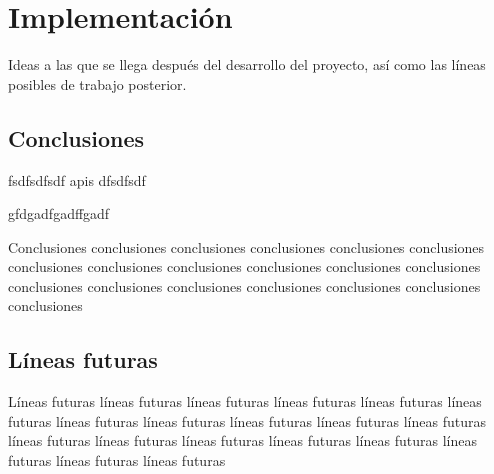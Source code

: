 \vspace*{-1cm}


\section{Implementación} %
\label{sec:implementacion}


Ideas a las que se llega después del desarrollo del proyecto, así como las líneas posibles de trabajo posterior.

\subsection{Conclusiones}

fsdfsdfsdf \glspl{api} dfsdfsdf 

gfdgadfgadffgadf \cite{android_developers_architectures}

Conclusiones conclusiones conclusiones conclusiones conclusiones conclusiones conclusiones conclusiones conclusiones conclusiones conclusiones conclusiones conclusiones conclusiones conclusiones conclusiones conclusiones conclusiones conclusiones

\subsection{Líneas futuras}
Líneas futuras líneas futuras líneas futuras líneas futuras líneas futuras líneas futuras líneas futuras líneas futuras líneas futuras líneas futuras líneas futuras líneas futuras líneas futuras líneas futuras líneas futuras líneas futuras líneas futuras líneas futuras líneas futuras